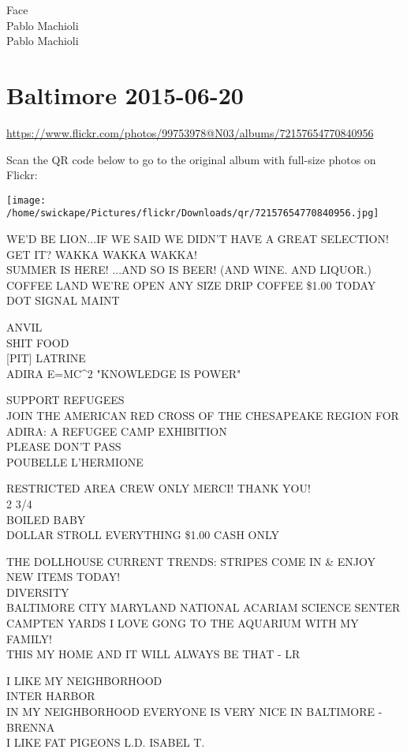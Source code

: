 \documentclass[10pt,letterpaper]{article}
\begin{document}
Face\\
Pablo Machioli\\
Pablo Machioli


\section*{Baltimore 2015-06-20}

\url{https://www.flickr.com/photos/99753978@N03/albums/72157654770840956}

Scan the QR code below to go to the original album with full-size photos on Flickr:

\texttt{[image: /home/swickape/Pictures/flickr/Downloads/qr/72157654770840956.jpg]}


WE'D BE LION...IF WE SAID WE DIDN'T HAVE A GREAT SELECTION!  GET IT?  WAKKA WAKKA WAKKA!\\
SUMMER IS HERE!  ...AND SO IS BEER!  (AND WINE.  AND LIQUOR.)\\
COFFEE LAND WE'RE OPEN ANY SIZE DRIP COFFEE \$1.00 TODAY\\
DOT SIGNAL MAINT

ANVIL\\
SHIT FOOD\\
{[}PIT{]} LATRINE\\
ADIRA E=MC\^{}2 "KNOWLEDGE IS POWER"

SUPPORT REFUGEES\\
JOIN THE AMERICAN RED CROSS OF THE CHESAPEAKE REGION FOR ADIRA: A REFUGEE CAMP EXHIBITION\\
PLEASE DON'T PASS\\
POUBELLE L'HERMIONE

RESTRICTED AREA CREW ONLY MERCI!  THANK YOU!\\
2 3/4\\
BOILED BABY\\
DOLLAR STROLL EVERYTHING \$1.00 CASH ONLY

THE DOLLHOUSE CURRENT TRENDS: STRIPES COME IN \& ENJOY NEW ITEMS TODAY!\\
DIVERSITY\\
BALTIMORE CITY MARYLAND NATIONAL ACARIAM SCIENCE SENTER CAMPTEN YARDS I LOVE GONG TO THE AQUARIUM WITH MY FAMILY!\\
THIS MY HOME AND IT WILL ALWAYS BE THAT {-} LR

I LIKE MY NEIGHBORHOOD\\
INTER HARBOR\\
IN MY NEIGHBORHOOD EVERYONE IS VERY NICE IN BALTIMORE {-} BRENNA\\
I LIKE FAT PIGEONS L.D. ISABEL T.
\end{document}
